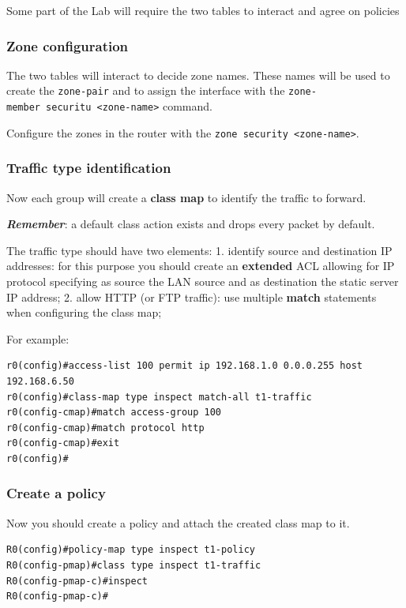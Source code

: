 \documentclass[11pt,a4paper]{article}
\begin{document}
Some part of the Lab will require the two tables to interact and agree
on policies

\subsubsection{Zone configuration}\label{zone-configuration}

The two tables will interact to decide zone names. These names will be
used to create the \texttt{zone-pair} and to assign the interface with
the \texttt{zone-member\ securitu\ \textless{}zone-name\textgreater{}}
command.

Configure the zones in the router with the
\texttt{zone\ security\ \textless{}zone-name\textgreater{}}.

\subsubsection{Traffic type
identification}\label{traffic-type-identification}

Now each group will create a \textbf{class map} to identify the traffic
to forward.

\textbf{\emph{Remember}}: a default class action exists and drops every
packet by default.

The traffic type should have two elements: 1. identify source and
destination IP addresses: for this purpose you should create an
\textbf{extended} ACL allowing for IP protocol specifying as source the
LAN source and as destination the static server IP address; 2. allow
HTTP (or FTP traffic): use multiple \textbf{match} statements when
configuring the class map;

For example:

\begin{verbatim}
r0(config)#access-list 100 permit ip 192.168.1.0 0.0.0.255 host 192.168.6.50
r0(config)#class-map type inspect match-all t1-traffic
r0(config-cmap)#match access-group 100
r0(config-cmap)#match protocol http
r0(config-cmap)#exit
r0(config)#
\end{verbatim}

\subsubsection{Create a policy}\label{create-a-policy}

Now you should create a policy and attach the created class map to it.

\begin{verbatim}
R0(config)#policy-map type inspect t1-policy
R0(config-pmap)#class type inspect t1-traffic
R0(config-pmap-c)#inspect
R0(config-pmap-c)#
\end{verbatim}
\end{document}
